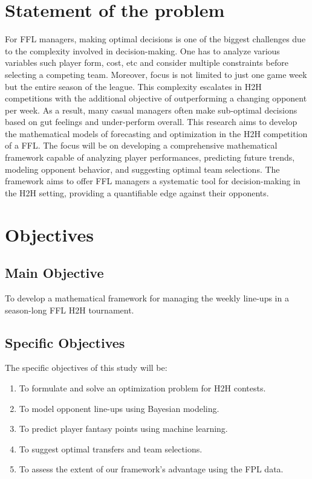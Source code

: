 \documentclass[12pt,oneside,a4paper]{book}
\theoremstyle{definition}
\theoremstyle{remark}
\begin{document}
		\section{Statement of the problem}
			For FFL managers, making optimal decisions is one of the biggest challenges due to the complexity involved in decision-making. One has to analyze various variables such player form, cost, etc and consider multiple constraints before selecting a competing team. Moreover, focus is not limited to just one game week but the entire season of the league. This complexity escalates in H2H competitions with the additional objective of outperforming a changing opponent per week. As a result, many casual managers often make sub-optimal decisions based on gut feelings and under-perform overall. This research aims to develop the mathematical models of forecasting and optimization in the H2H competition of a FFL. The focus will be on developing a comprehensive mathematical framework capable of analyzing player performances, predicting future trends, modeling opponent behavior, and suggesting optimal team selections. The framework aims to offer FFL managers a systematic tool for decision-making in the H2H setting, providing a quantifiable edge against their opponents.


		\section{Objectives}
			\subsection{Main Objective}
				To develop a mathematical framework for managing the weekly line-ups in a season-long FFL H2H tournament.

			\subsection{Specific Objectives}
				The specific objectives of this study will be:
				\begin{enumerate}
					\renewcommand{\labelenumi}{(\roman{enumi})}  %
					\renewcommand{\theenumi}{\roman{enumi}}      %
					\item To formulate and solve an optimization problem for H2H contests. \label{obj:formulate}
					\item To model opponent line-ups using Bayesian modeling. \label{obj:opponents}
					\item To predict player fantasy points using machine learning. \label{obj:predict}
					\item To suggest optimal transfers and team selections. \label{obj:transfers}
					\item To assess the extent of our framework's advantage using the FPL data. \label{obj:assess}
				\end{enumerate}
\end{document}
